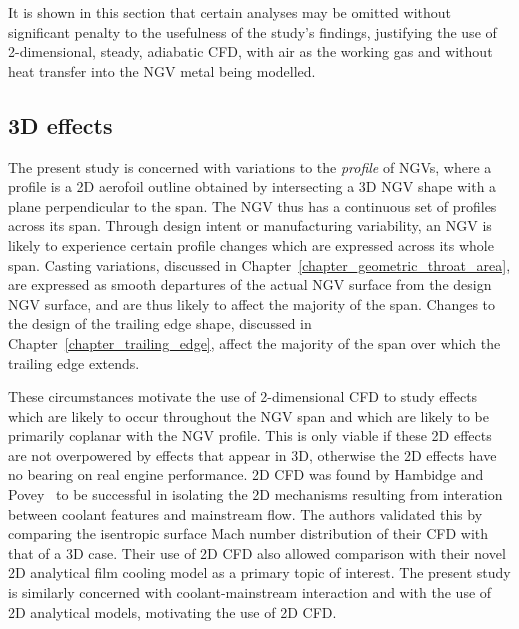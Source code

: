 \documentclass[a4paper, 11pt, oneside]{report}
\begin{document}
It is shown in this section that certain analyses may be omitted without significant penalty to the usefulness of the study's findings, justifying the use of 2-dimensional, steady, adiabatic CFD, with air as the working gas and without heat transfer into the NGV metal being modelled.

\subsection{3D effects}

The present study is concerned with variations to the \textit{profile} of NGVs, where a profile is a 2D aerofoil outline obtained by intersecting a 3D NGV shape with a plane perpendicular to the span. The NGV thus has a continuous set of profiles across its span. Through design intent or manufacturing variability, an NGV is likely to experience certain profile changes which are expressed across its whole span. Casting variations, discussed in Chapter~\ref{chapter_geometric_throat_area}, are expressed as smooth departures of the actual NGV surface from the design NGV surface, and are thus likely to affect the majority of the span. Changes to the design of the trailing edge shape, discussed in Chapter~\ref{chapter_trailing_edge}, affect the majority of the span over which the trailing edge extends.

These circumstances motivate the use of 2-dimensional CFD to study effects which are likely to occur throughout the NGV span and which are likely to be primarily coplanar with the NGV profile. This is only viable if these 2D effects are not overpowered by effects that appear in 3D, otherwise the 2D effects have no bearing on real engine performance. 2D CFD was found by Hambidge and Povey~\cite{hambidge_film_cooling} to be successful in isolating the 2D mechanisms resulting from interation between coolant features and mainstream flow. The authors validated this by comparing the isentropic surface Mach number distribution of their CFD with that of a 3D case. Their use of 2D CFD also allowed comparison with their novel 2D analytical film cooling model as a primary topic of interest. The present study is similarly concerned with coolant-mainstream interaction and with the use of 2D analytical models, motivating the use of 2D CFD.
\end{document}

